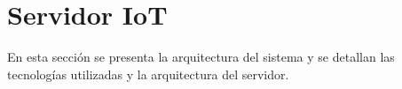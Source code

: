 



\section{Servidor IoT}

En esta sección se presenta la arquitectura del sistema y se detallan las
tecnologías utilizadas y la arquitectura del servidor.




